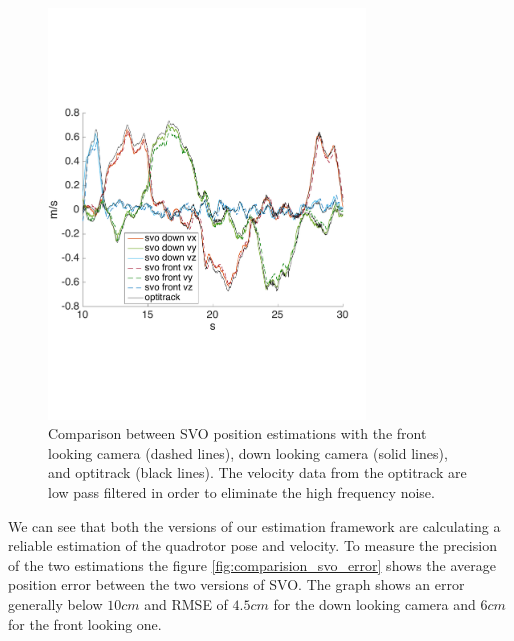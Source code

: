 \begin{figure}[!ht]
    \centering
    \includegraphics[width=0.75\textwidth]{img/comparision_between_two_svo_and_opti_velocities.pdf}
    \caption{Comparison between SVO position estimations with the front looking camera (dashed lines), down looking camera (solid lines), and optitrack (black lines). The velocity data from the optitrack are low pass filtered in order to eliminate the high frequency noise.  }
    \label{fig:comparision_svo_velocities}
\end{figure}

We can see that both the versions of our estimation framework are calculating a reliable estimation of the quadrotor pose and velocity. To measure the precision of the two estimations the figure \ref{fig:comparision_svo_error} shows the average position error between the two versions of SVO. The graph shows an error generally below $10cm$ and RMSE of $4.5cm$ for the down looking camera and $6cm$ for the front looking one.\\

